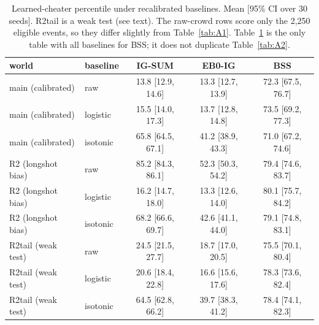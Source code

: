\documentclass[10pt]{article}
\begin{document}
\begin{table}[!ht]
\centering\small
\caption{Learned-cheater percentile under recalibrated baselines. Mean [95\% CI over 30 seeds]. R2tail is a weak test (see text). The raw-crowd rows score only the 2,250 eligible events, so they differ slightly from Table~\ref{tab:A1}. Table~\ref{tab:A9} is the only table with all baselines for BSS; it does not duplicate Table~\ref{tab:A2}.}
\label{tab:A9}
\begin{tabular}{@{}llccc@{}}
\toprule
world & baseline & IG-SUM & EB0-IG & BSS \\
\midrule
main (calibrated) & raw & 13.8 [12.9, 14.6] & 13.3 [12.7, 13.9] & 72.3 [67.5, 76.7] \\
main (calibrated) & logistic & 15.5 [14.0, 17.3] & 13.7 [12.8, 14.8] & 73.5 [69.2, 77.3] \\
main (calibrated) & isotonic & 65.8 [64.5, 67.1] & 41.2 [38.9, 43.3] & 71.0 [67.2, 74.6] \\
R2 (longshot bias) & raw & 85.2 [84.3, 86.1] & 52.3 [50.3, 54.2] & 79.4 [74.6, 83.7] \\
R2 (longshot bias) & logistic & 16.2 [14.7, 18.0] & 13.3 [12.6, 14.0] & 80.1 [75.7, 84.2] \\
R2 (longshot bias) & isotonic & 68.2 [66.6, 69.7] & 42.6 [41.1, 44.0] & 79.1 [74.8, 83.1] \\
R2tail (weak test) & raw & 24.5 [21.5, 27.7] & 18.7 [17.0, 20.5] & 75.5 [70.1, 80.4] \\
R2tail (weak test) & logistic & 20.6 [18.4, 22.8] & 16.6 [15.6, 17.6] & 78.3 [73.6, 82.4] \\
R2tail (weak test) & isotonic & 64.5 [62.8, 66.2] & 39.7 [38.3, 41.2] & 78.4 [74.1, 82.3] \\
\bottomrule
\end{tabular}
\end{table}
\end{document}
